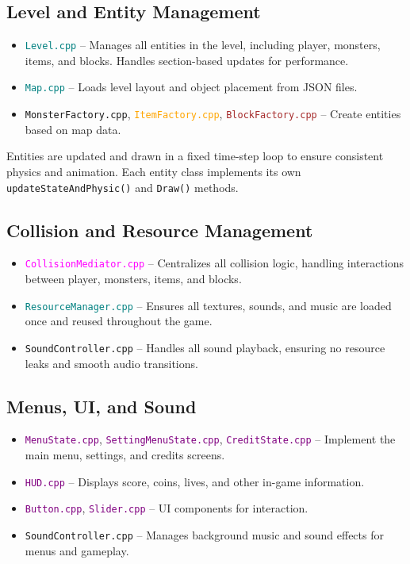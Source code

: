 \begin{flushleft}
\subsection*{Level and Entity Management}

\begin{itemize}
    \item \texttt{\textcolor{teal}{Level.cpp}} – Manages all entities in the level, including player, monsters, items, and blocks. Handles section-based updates for performance.
    \item \texttt{\textcolor{teal}{Map.cpp}} – Loads level layout and object placement from JSON files.
    \item \texttt{\textcolor{green!60!black}{MonsterFactory.cpp}}, \texttt{\textcolor{orange}{ItemFactory.cpp}}, \texttt{\textcolor{brown}{BlockFactory.cpp}} – Create entities based on map data.
\end{itemize}

Entities are updated and drawn in a fixed time-step loop to ensure consistent physics and animation. Each entity class implements its own \texttt{updateStateAndPhysic()} and \texttt{Draw()} methods.

\subsection*{Collision and Resource Management }

\begin{itemize}
    \item \texttt{\textcolor{magenta}{CollisionMediator.cpp}} – Centralizes all collision logic, handling interactions between player, monsters, items, and blocks.
    \item \texttt{\textcolor{teal}{ResourceManager.cpp}} – Ensures all textures, sounds, and music are loaded once and reused throughout the game.
    \item \texttt{\textcolor{cyan!80!black}{SoundController.cpp}} – Handles all sound playback, ensuring no resource leaks and smooth audio transitions.
\end{itemize}

\subsection*{Menus, UI, and Sound }

\begin{itemize}
    \item \texttt{\textcolor{purple}{MenuState.cpp}}, \texttt{\textcolor{purple}{SettingMenuState.cpp}}, \texttt{\textcolor{purple}{CreditState.cpp}} – Implement the main menu, settings, and credits screens.
    \item \texttt{\textcolor{purple}{HUD.cpp}} – Displays score, coins, lives, and other in-game information.
    \item \texttt{\textcolor{purple}{Button.cpp}}, \texttt{\textcolor{purple}{Slider.cpp}} – UI components for interaction.
    \item \texttt{\textcolor{cyan!80!black}{SoundController.cpp}} – Manages background music and sound effects for menus and gameplay.
\end{itemize}


\end{flushleft}
